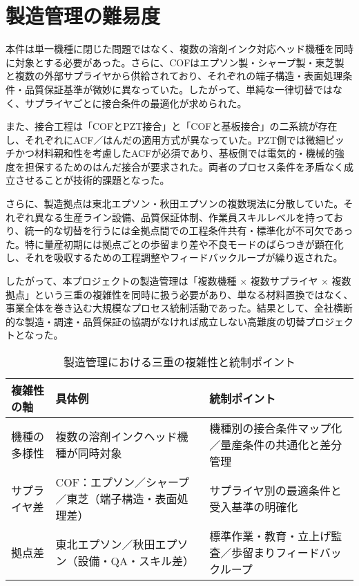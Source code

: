 \documentclass[conference]{IEEEtran}
\begin{document}
\section{製造管理の難易度}
本件は単一機種に閉じた問題ではなく、複数の溶剤インク対応ヘッド機種を同時に対象とする必要があった。さらに、COFはエプソン製・シャープ製・東芝製と複数の外部サプライヤから供給されており、それぞれの端子構造・表面処理条件・品質保証基準が微妙に異なっていた。したがって、単純な一律切替ではなく、サプライヤごとに接合条件の最適化が求められた。  

また、接合工程は「COFとPZT接合」と「COFと基板接合」の二系統が存在し、それぞれにACF／はんだの適用方式が異なっていた。PZT側では微細ピッチかつ材料親和性を考慮したACFが必須であり、基板側では電気的・機械的強度を担保するためのはんだ接合が要求された。両者のプロセス条件を矛盾なく成立させることが技術的課題となった。  

さらに、製造拠点は東北エプソン・秋田エプソンの複数現法に分散していた。それぞれ異なる生産ライン設備、品質保証体制、作業員スキルレベルを持っており、統一的な切替を行うには全拠点間での工程条件共有・標準化が不可欠であった。特に量産初期には拠点ごとの歩留まり差や不良モードのばらつきが顕在化し、それを吸収するための工程調整やフィードバックループが繰り返された。  

したがって、本プロジェクトの製造管理は「複数機種 × 複数サプライヤ × 複数拠点」という三重の複雑性を同時に扱う必要があり、単なる材料置換ではなく、事業全体を巻き込む大規模なプロセス統制活動であった。結果として、全社横断的な製造・調達・品質保証の協調がなければ成立しない高難度の切替プロジェクトとなった。

\begin{table}[t]
\centering
\footnotesize
\caption{製造管理における三重の複雑性と統制ポイント}
\label{tab:complexity}
\renewcommand{\arraystretch}{1.1}
\begin{tabularx}{\columnwidth}{@{}p{2.4cm} Y Y@{}}
\toprule
複雑性の軸 & 具体例 & 統制ポイント \\
\midrule
機種の多様性 &
複数の溶剤インクヘッド機種が同時対象 &
機種別の接合条件マップ化／量産条件の共通化と差分管理 \\
\addlinespace[2pt]
サプライヤ差 &
COF：エプソン／シャープ／東芝（端子構造・表面処理差） &
サプライヤ別の最適条件と受入基準の明確化 \\
\addlinespace[2pt]
拠点差 &
東北エプソン／秋田エプソン（設備・QA・スキル差） &
標準作業・教育・立上げ監査／歩留まりフィードバックループ \\
\bottomrule
\end{tabularx}
\end{table}
\end{document}
